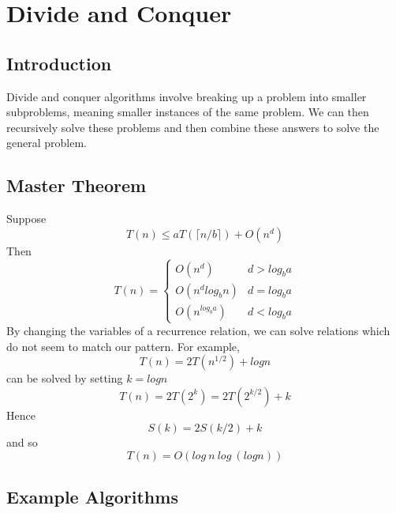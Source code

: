 \documentclass{article}
\begin{document}
\section{Divide and Conquer}
    \subsection{Introduction}
        Divide and conquer algorithms involve breaking up a problem into smaller subproblems, meaning smaller instances of the same problem. We can then recursively solve these problems and then combine these answers to solve the general problem. 
    \subsection{Master Theorem}
        Suppose
        \[T(n) \leq aT(\lceil n / b \rceil) + O(n^d)\]
        Then
        \[ 
                T(n) = 
                \begin{cases} 
                    O(n^d) & d > log_b a \\
                    O(n^d log_b n) & d = log_b a \\
                    O(n^{log_b a}) & d < log_b a
                \end{cases}
            \]
        By changing the variables of a recurrence relation, we can solve relations which do not seem to match our pattern. For example,
        \[ T(n) = 2T(n^{1/2}) + log n \]
        can be solved by setting $k = log n$
        \[ T(n) = 2T(2^k) = 2T(2^{k/2}) + k\]
        Hence 
        \[S(k) = 2S(k/2) + k\]   
        and so
        \[ T(n) = O(log \: n \: log \: (log n)) \]
    \subsection{Example Algorithms}
\end{document}
